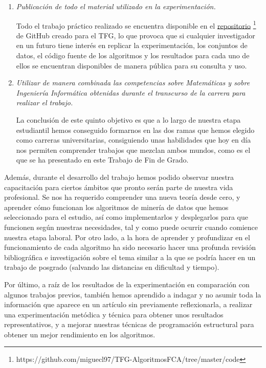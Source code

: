 \documentclass[oneside,openright,titlepage,numbers=noenddot,openany,headinclude,footinclude=true,
cleardoublepage=empty,abstractoff,BCOR=5mm,paper=a4,fontsize=12pt,main=spanish]{scrreprt}
\begin{document}
\begin{enumerate}
    \item \textit{Publicación de todo el material utilizado en la experimentación.}
    
    Todo el trabajo práctico realizado se encuentra disponible en el \href{https://github.com/miguecl97/TFG-AlgoritmosFCA/tree/master/code}{repositorio} \footnote{https://github.com/miguecl97/TFG-AlgoritmosFCA/tree/master/code} de GitHub creado para el TFG, lo que provoca que si cualquier investigador en un futuro tiene interés en replicar la experimentación, los conjuntos de datos, el código fuente de los algoritmos y los resultados para cada uno de ellos se encuentran disponibles de manera pública para su consulta y uso.\\
    
    \item \textit{Utilizar de manera combinada las competencias sobre Matemáticas y sobre Ingeniería Informática obtenidas durante el transcurso de la carrera para realizar el trabajo.}
    
    La conclusión de este quinto objetivo es que a lo largo de nuestra etapa estudiantil hemos conseguido formarnos en las dos ramas que hemos elegido como carreras universitarias, consiguiendo unas habilidades que hoy en día nos permiten comprender trabajos que mezclan ambos mundos, como es el que se ha presentado en este Trabajo de Fin de Grado.\\
    
\end{enumerate}

Además, durante el desarrollo del trabajo hemos podido observar nuestra capacitación para ciertos ámbitos que pronto serán parte de nuestra vida profesional. Se nos ha requerido comprender una nueva teoría desde cero, y aprender cómo funcionan los algoritmos de minería de datos que hemos seleccionado para el estudio, así como implementarlos y desplegarlos para que funcionen según nuestras necesidades, tal y como puede ocurrir cuando comience nuestra etapa laboral. Por otro lado, a la hora de aprender y profundizar en el funcionamiento de cada algoritmo ha sido necesario hacer una profunda revisión bibliográfica e investigación sobre el tema similar a la que se podría hacer en un trabajo de posgrado (salvando las distancias en dificultad y tiempo).

Por último, a raíz de los resultados de la experimentación en comparación con algunos trabajos previos, también hemos aprendido a indagar y no asumir toda la información que aparece en un artículo sin previamente reflexionarla, a realizar una experimentación metódica y técnica para obtener unos resultados representativos, y a mejorar nuestras técnicas de programación estructural para obtener un mejor rendimiento en los algoritmos. \\
\end{document}
